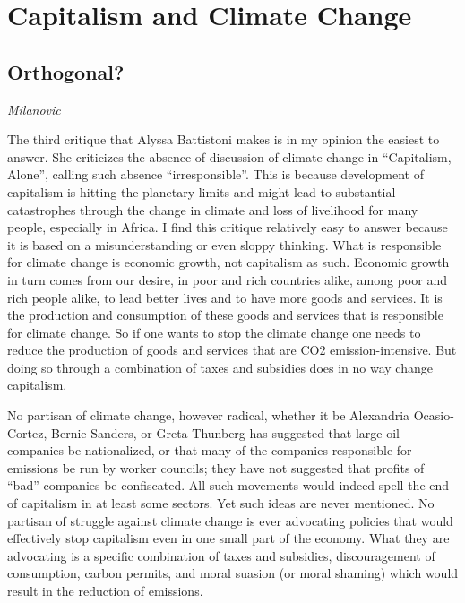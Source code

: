 \documentclass[
]{book}
\begin{document}
\hypertarget{capitalism-and-climate-change}{%
\chapter{Capitalism and Climate Change}\label{capitalism-and-climate-change}}

\hypertarget{orthogonal}{%
\section{Orthogonal?}\label{orthogonal}}

\emph{Milanovic}

The third critique that Alyssa Battistoni makes is in my opinion the easiest to answer. She criticizes the absence of discussion of climate change in ``Capitalism, Alone'', calling such absence ``irresponsible''. This is because development of capitalism is hitting the planetary limits and might lead to substantial catastrophes through the change in climate and loss of livelihood for many people, especially in Africa. I find this critique relatively easy to answer because it is based on a misunderstanding or even sloppy thinking. What is responsible for climate change is economic growth, not capitalism as such. Economic growth in turn comes from our desire, in poor and rich countries alike, among poor and rich people alike, to lead better lives and to have more goods and services. It is the production and consumption of these goods and services that is responsible for climate change. So if one wants to stop the climate change one needs to reduce the production of goods and services that are CO2 emission-intensive. But doing so through a combination of taxes and subsidies does in no way change capitalism.

No partisan of climate change, however radical, whether it be Alexandria Ocasio-Cortez, Bernie Sanders, or Greta Thunberg has suggested that large oil companies be nationalized, or that many of the companies responsible for emissions be run by worker councils; they have not suggested that profits of ``bad'' companies be confiscated. All such movements would indeed spell the end of capitalism in at least some sectors. Yet such ideas are never mentioned. No partisan of struggle against climate change is ever advocating policies that would effectively stop capitalism even in one small part of the economy. What they are advocating is a specific combination of taxes and subsidies, discouragement of consumption, carbon permits, and moral suasion (or moral shaming) which would result in the reduction of emissions.
\end{document}
